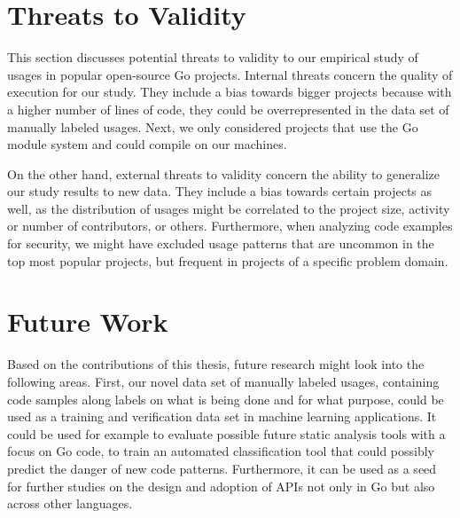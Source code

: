\section{Threats to Validity}\label{sec:discussion:threats-to-validity}

This section discusses potential threats to validity to our empirical study of \unsafe{} usages in popular open-source
Go projects.
Internal threats concern the quality of execution for our study.
They include a bias towards bigger projects because with a higher number of lines of code, they could be
overrepresented in the data set of manually labeled \unsafe{} usages.
Next, we only considered projects that use the Go module system and could compile on our machines.

On the other hand, external threats to validity concern the ability to generalize our study results to new data.
They include a bias towards certain projects as well, as the distribution of \unsafe{} usages might be correlated to the
project size, activity or number of contributors, or others.
Furthermore, when analyzing \unsafe{} code examples for security, we might have excluded usage patterns that are
uncommon in the top \projsTotal{} most popular projects, but frequent in projects of a specific problem domain.



\section{Future Work}\label{sec:discussion:future-work}

Based on the contributions of this thesis, future research might look into the following areas.
First, our novel data set of manually labeled \unsafe{} usages, containing code samples along labels on what is being
done and for what purpose, could be used as a training and verification data set in machine learning applications.
It could be used for example to evaluate possible future static analysis tools with a focus on \unsafe{} Go code,
to train an automated classification tool that could possibly predict the danger of new \unsafe{} code patterns.
Furthermore, it can be used as a seed for further studies on the design and adoption of \unsafe{} APIs not only in Go
but also across other languages.

